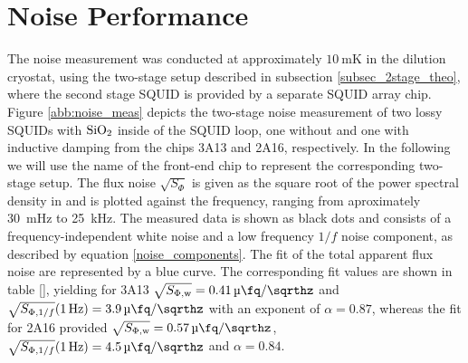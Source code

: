  




\section{Noise Performance} \label{sec_noise_results}


The noise measurement was conducted at approximately $\qty{10}{\milli\kelvin}$ in the dilution cryostat, using the two-stage setup described in subsection \ref{subsec_2stage_theo}, where the second stage SQUID is provided by a separate SQUID array chip. Figure \ref{abb:noise_meas} depicts the two-stage noise measurement of two lossy SQUIDs with ${\rm SiO_2}$ inside of the SQUID loop, one without and one with inductive damping from the chips 3A13 and 2A16, respectively. In the following we will use the name of the front-end chip to represent the corresponding two-stage setup. The flux noise $\sqrt{S_\Phi}$ is given as the square root of the power spectral density in and is plotted against the frequency, ranging from aproximately \qty{30}{\milli\hertz} to \qty{25}{\kHz}. The measured data is shown as black dots and consists of a frequency-independent white noise and a low frequency $1/f$ noise component, as described by equation \ref{noise_components}. The fit of the total apparent flux noise are represented by a blue curve. The corresponding fit values are shown in table \ref{}, yielding for 3A13 $\sqrt{S_{\rm \Phi,w}}=\qty{0.41}{\micro\fq\per\sqrthz}$ and $\sqrt{S_{{\rm \Phi},1/f}}(\qty{1}{\Hz})=\qty{3.9}{\micro\fq\per\sqrthz}$ with an exponent of $\alpha=0.87$, whereas the fit for 2A16 provided $\sqrt{S_{\rm \Phi,w}}=\qty{0.57}{\micro\fq\per\sqrthz}$, $\sqrt{S_{{\rm \Phi},1/f}}(\qty{1}{\Hz})=\qty{4.5}{\micro\fq\per\sqrthz}$ and $\alpha=0.84$.

